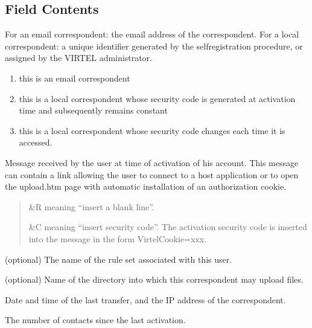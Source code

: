 \documentclass[letterpaper,10pt,english]{sphinxmanual}
\begin{document}
\subsection{Field Contents}
\label{\detokenize{audit_operations_ and_performance:field-contents}}\label{\detokenize{audit_operations_ and_performance:index-52}}\begin{description}
\sphinxAtStartPar
For an e\sphinxhyphen{}mail correspondent: the e\sphinxhyphen{}mail address of the correspondent. For a local correspondent: a unique identifier generated by the self\sphinxhyphen{}registration procedure, or assigned by the VIRTEL administrator.

\begin{enumerate}
%
\item {} 
\sphinxAtStartPar
this is an e\sphinxhyphen{}mail correspondent

\item {} 
\sphinxAtStartPar
this is a local correspondent whose security code is generated at activation time and subsequently remains constant

\item {} 
\sphinxAtStartPar
this is a local correspondent whose security code changes each time it is accessed.

\end{enumerate}

\sphinxAtStartPar
Message received by the user at time of activation of his account. This message can contain a link allowing the user to connect to a host application or to open the upload.htm page with automatic installation of an authorization cookie.
\begin{quote}
\begin{description}
\sphinxAtStartPar
\&R meaning “insert a blank line”.

\sphinxAtStartPar
\&C meaning “insert security code”. The activation security code is inserted into the message in the form VirtelCookie=xxx.

\end{description}
\end{quote}

\sphinxAtStartPar
(optional) The name of the rule set associated with this user.

\sphinxAtStartPar
(optional) Name of the directory into which this correspondent may upload files.

\sphinxAtStartPar
Date and time of the last transfer, and the IP address of the correspondent.

\sphinxAtStartPar
The number of contacts since the last activation.

\end{description}
\end{document}
